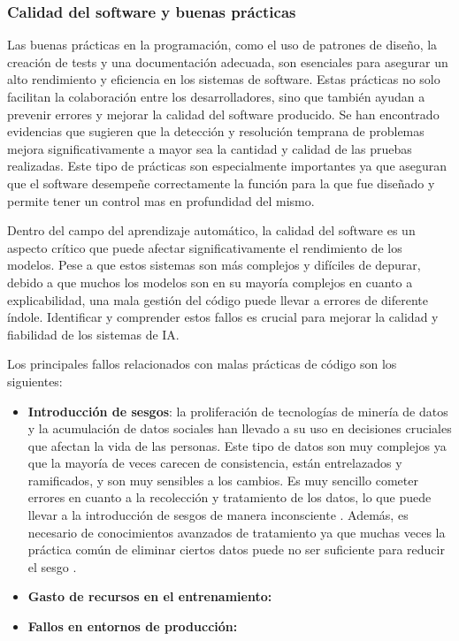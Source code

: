 \subsubsection{Calidad del software y buenas prácticas}
Las buenas prácticas en la programación, como el uso de patrones de diseño, la 
creación de tests y una documentación adecuada, son esenciales para asegurar un 
alto rendimiento y eficiencia en los sistemas de software. Estas prácticas no solo facilitan 
la colaboración entre los desarrolladores, sino que también ayudan a prevenir errores y 
mejorar la calidad del software producido. Se han encontrado evidencias \cite{Athanasiou2014Test} 
que sugieren que la detección y resolución temprana de problemas mejora significativamente a mayor sea la
cantidad y calidad de las pruebas realizadas. Este tipo de prácticas son especialmente importantes
ya que aseguran que el software desempeñe correctamente la función para la que fue diseñado y
permite tener un control mas en profundidad del mismo.\medskip

Dentro del campo del aprendizaje automático, la calidad del software es un aspecto crítico 
que puede afectar significativamente el rendimiento de los modelos. Pese a que estos sistemas
son más complejos y difíciles de depurar, debido a que muchos los modelos son en su mayoría
complejos en cuanto a explicabilidad, una mala gestión del código puede llevar a errores
de diferente índole. Identificar y comprender estos fallos es crucial para mejorar la calidad y fiabilidad de 
los sistemas de IA.\medskip

Los principales fallos relacionados con malas prácticas de código son los siguientes:

\begin{itemize}
    \item \textbf{Introducción de sesgos}: la proliferación de tecnologías 
    de minería de datos y la acumulación de datos sociales han llevado a su uso en 
    decisiones cruciales que afectan la vida de las personas\cite{kamishima2012fairness}. Este tipo de datos son
    muy complejos ya que la mayoría de veces carecen de consistencia, están entrelazados
    y ramificados, y son muy sensibles a los cambios. Es muy sencillo cometer errores en cuanto
    a la recolección y tratamiento de los datos, lo que puede llevar a la introducción de sesgos
    de manera inconsciente \cite{galhotra2017fairness}. Además, es necesario de conocimientos
    avanzados de tratamiento ya que muchas veces la práctica común de eliminar ciertos datos
    puede no ser suficiente para reducir el sesgo \cite{kamishima2012fairness}.
    \item \textbf{Gasto de recursos en el entrenamiento:} 
    \item \textbf{Fallos en entornos de producción:} 
\end{itemize}
 


\pagebreak